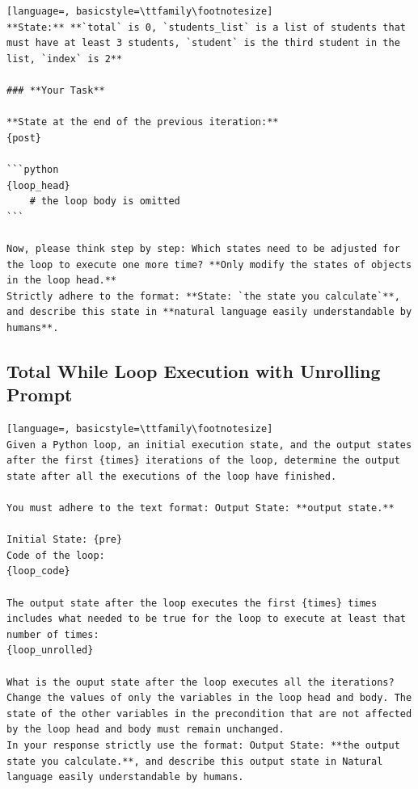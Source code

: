 \documentclass[sigconf]{acmart}
\begin{document}
\begin{tcolorbox}[ colback=gray!10, colframe=black, arc=5pt]
\begin{lstlisting}[language=, basicstyle=\ttfamily\footnotesize]
**State:** **`total` is 0, `students_list` is a list of students that must have at least 3 students, `student` is the third student in the list, `index` is 2**

### **Your Task**

**State at the end of the previous iteration:**  
{post}

```python
{loop_head}
    # the loop body is omitted
```

Now, please think step by step: Which states need to be adjusted for the loop to execute one more time? **Only modify the states of objects in the loop head.**
Strictly adhere to the format: **State: `the state you calculate`**, and describe this state in **natural language easily understandable by humans**.
\end{lstlisting}
\end{tcolorbox}


\subsection{Total While Loop Execution with Unrolling Prompt}
\label{total_while_prompt}
\begin{tcolorbox}[ colback=gray!10, colframe=black, arc=5pt]
\begin{lstlisting}[language=, basicstyle=\ttfamily\footnotesize]
Given a Python loop, an initial execution state, and the output states after the first {times} iterations of the loop, determine the output state after all the executions of the loop have finished.

You must adhere to the text format: Output State: **output state.**

Initial State: {pre}
Code of the loop:
{loop_code}

The output state after the loop executes the first {times} times includes what needed to be true for the loop to execute at least that number of times:
{loop_unrolled}

What is the ouput state after the loop executes all the iterations? Change the values of only the variables in the loop head and body. The state of the other variables in the precondition that are not affected by the loop head and body must remain unchanged.
In your response strictly use the format: Output State: **the output state you calculate.**, and describe this output state in Natural language easily understandable by humans.

\end{lstlisting}
\end{tcolorbox}
\end{document}
